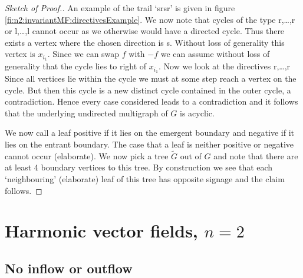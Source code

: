 \begin{proof}[Sketch of Proof.]
  An example of the trail `srsr' is given in figure \ref{fi:n2:invariantMF:directivesExample}.
  We now note that cycles of the type r,\dots,r or l,\dots,l
  cannot occur as we otherwise would have a directed cycle. Thus there exists a vertex where the chosen direction is s. 
  Without loss of generality this vertex is $x_{i_1}$.
  Since we can swap $f$ with $-f$ we can assume without loss of generality that the cycle lies to right of $x_{i_1}$.
  Now we look at the directives r,\dots,r
  Since all vertices lie within the cycle we must at some step reach a vertex on the cycle. But then this cycle is a new distinct cycle
  contained in the outer cycle, a contradiction.
  Hence every case considered leads to a contradiction and it follows that the underlying undirected multigraph of $G$
  is acyclic.
  
  We now call a leaf positive if it lies on the emergent boundary and
  negative if it lies on the entrant boundary. The case that a leaf is neither positive or negative cannot occur (elaborate).
  We now pick a tree $\widetilde{G}$ out of $G$ and note that
  there are at least 4 boundary vertices to this tree.
  By construction we see that each `neighbouring' (elaborate) leaf of this tree
  has opposite signage and the claim follows.
\end{proof} 


\newpage

\section*{Harmonic vector fields, $n=2$}

\subsection*{No inflow or outflow}

